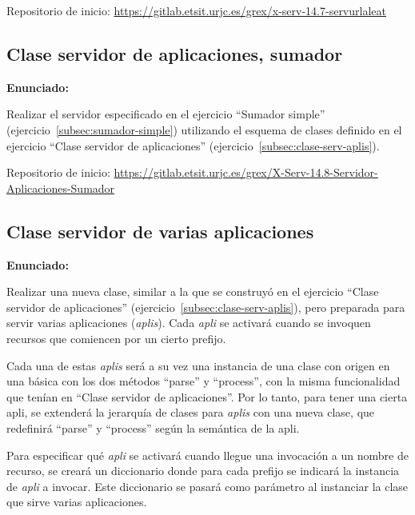 Repositorio de inicio: \url{https://gitlab.etsit.urjc.es/grex/x-serv-14.7-servurlaleat}

\subsection{Clase servidor de aplicaciones, sumador}
\label{subsec:clase-sumador-simple}

\textbf{Enunciado:}

Realizar el servidor especificado en el ejercicio ``Sumador simple'' (ejercicio~\ref{subsec:sumador-simple}) utilizando el esquema de clases definido en el ejercicio ``Clase servidor de aplicaciones'' (ejercicio~\ref{subsec:clase-serv-aplis}).

Repositorio de inicio: \url{https://gitlab.etsit.urjc.es/grex/X-Serv-14.8-Servidor-Aplicaciones-Sumador}

\subsection{Clase servidor de varias aplicaciones}
\label{subsec:clase-serv-aplis-multi}

\textbf{Enunciado:}

Realizar una nueva clase, similar a la que se construyó en el ejercicio ``Clase servidor de aplicaciones'' (ejercicio~\ref{subsec:clase-serv-aplis}), pero preparada para servir varias aplicaciones (\emph{aplis}). Cada \emph{apli} se activará cuando se invoquen recursos que comiencen por un cierto prefijo.

Cada una de estas \emph{aplis} será a su vez una instancia de una clase con origen en una básica con los dos métodos ``parse'' y ``process'', con la misma funcionalidad que tenían en ``Clase servidor de aplicaciones''. Por lo tanto, para tener una cierta apli, se extenderá la jerarquía de clases para \emph{aplis} con una nueva clase, que redefinirá ``parse'' y ``process'' según la semántica de la apli.

Para especificar qué \emph{apli} se activará cuando llegue una invocación a un nombre de recurso, se creará un diccionario donde para cada prefijo se indicará la instancia de \emph{apli} a invocar. Este diccionario se pasará como parámetro al instanciar la clase que sirve varias aplicaciones.

